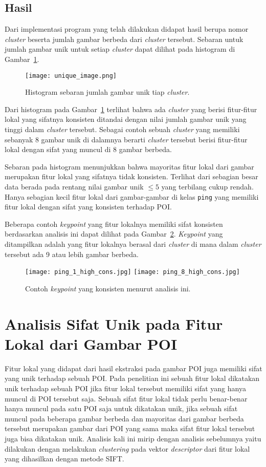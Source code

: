 \subsection{Hasil}
Dari implementasi program yang telah dilakukan didapat hasil berupa nomor \textit{cluster} beserta jumlah gambar berbeda dari \textit{cluster} tersebut. Sebaran untuk jumlah gambar unik untuk setiap \textit{cluster} dapat dilihat pada histogram di Gambar~\ref{fig:unique_image}.
\begin{figure}[H]
	\centering
	\texttt{[image: unique\_image.png]}
	\caption{Histogram sebaran jumlah gambar unik tiap \textit{cluster}.}
	\label{fig:unique_image}
\end{figure}
Dari histogram pada Gambar~\ref{fig:unique_image} terlihat bahwa ada \textit{cluster} yang berisi fitur-fitur lokal yang sifatnya konsisten ditandai dengan nilai jumlah gambar unik yang tinggi dalam \textit{cluster} tersebut. Sebagai contoh sebuah \textit{cluster} yang memiliki sebanyak 8 gambar unik di dalamnya berarti \textit{cluster} tersebut berisi fitur-fitur lokal dengan sifat yang muncul di 8 gambar berbeda. 

Sebaran pada histogram menunjukkan bahwa mayoritas fitur lokal dari gambar merupakan fitur lokal yang sifatnya tidak konsisten. Terlihat dari sebagian besar data berada pada rentang nilai gambar unik $\leq5$ yang terbilang cukup rendah. Hanya sebagian kecil fitur lokal dari gambar-gambar di kelas \texttt{ping} yang memiliki fitur lokal dengan sifat yang konsisten terhadap POI.

Beberapa contoh \textit{keypoint} yang fitur lokalnya memiliki sifat konsisten berdasarkan analisis ini dapat dilihat pada Gambar~\ref{fig:keypoint_konsisten}. \textit{Keypoint} yang ditampilkan adalah yang fitur lokalnya berasal dari \textit{cluster} di mana dalam \textit{cluster} tersebut ada 9 atau lebih gambar berbeda.
\begin{figure}[H]
	\centering
	\texttt{[image: ping\_1\_high\_cons.jpg]}
	\texttt{[image: ping\_8\_high\_cons.jpg]}
	\caption{Contoh \textit{keypoint} yang konsisten menurut analisis ini.}
	\label{fig:keypoint_konsisten}
\end{figure}

\section{Analisis Sifat Unik pada Fitur Lokal dari Gambar POI}
\label{sec:analisis_keunikan}
Fitur lokal yang didapat dari hasil ekstraksi pada gambar POI juga memiliki sifat yang unik terhadap sebuah POI. Pada penelitian ini sebuah fitur lokal dikatakan unik terhadap sebuah POI jika fitur lokal tersebut memiliki sifat yang hanya muncul di POI tersebut saja. Sebuah sifat fitur lokal tidak perlu benar-benar hanya muncul pada satu POI saja untuk dikatakan unik, jika sebuah sifat muncul pada beberapa gambar berbeda dan mayoritas dari gambar berbeda tersebut merupakan gambar dari POI yang sama maka sifat fitur lokal tersebut juga bisa dikatakan unik. Analisis kali ini mirip dengan analisis sebelumnya yaitu dilakukan dengan melakukan \textit{clustering} pada vektor \textit{descriptor} dari fitur lokal yang dihasilkan dengan metode SIFT.

